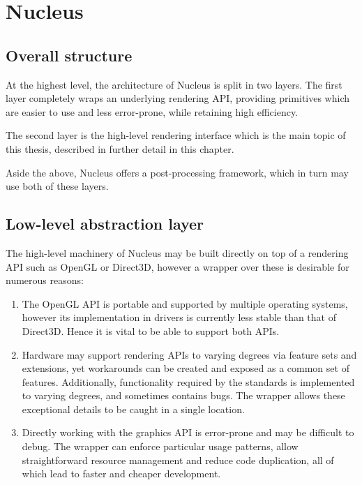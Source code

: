 
\chapter{ Nucleus }
\label{Chapter4}

\section{Overall structure}

At the highest level, the architecture of Nucleus is split in two layers. The first layer completely wraps an underlying rendering API, providing primitives which are easier to use and less error-prone, while retaining high efficiency.

The second layer is the high-level rendering interface which is the main topic of this thesis, described in further detail in this chapter.

Aside the above, Nucleus offers a post-processing framework, which in turn may use both of these layers.

\section{Low-level abstraction layer}
\label{sec:lowLevelInfo}

The high-level machinery of Nucleus may be built directly on top of a rendering API such as OpenGL or Direct3D, however a wrapper over these is desirable for numerous reasons:

\begin{enumerate}
\item The OpenGL API is portable and supported by multiple operating systems, however its implementation in drivers is currently less stable than that of Direct3D. Hence it is vital to be able to support both APIs.
\item Hardware may support rendering APIs to varying degrees via feature sets and extensions, yet workarounds can be created and exposed as a common set of features. Additionally, functionality required by the standards is implemented to varying degrees, and sometimes contains bugs. The wrapper allows these exceptional details to be caught in a single location.
\item Directly working with the graphics API is error-prone and may be difficult to debug. The wrapper can enforce particular usage patterns, allow straightforward resource management and reduce code duplication, all of which lead to faster and cheaper development.
\end{enumerate}


